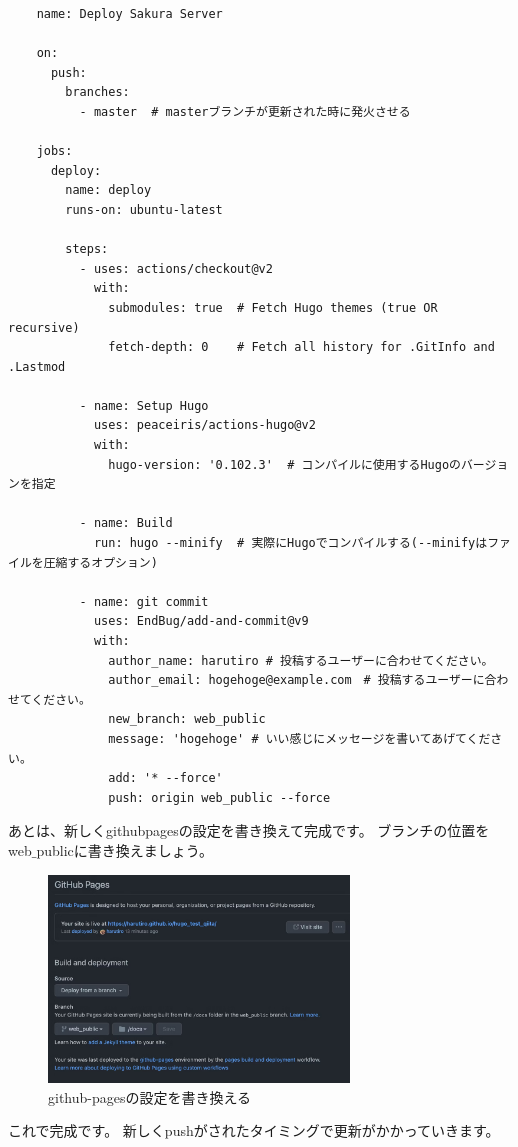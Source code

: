 \begin{tcolorbox}[breakable]
  \begin{verbatim}
    name: Deploy Sakura Server

    on:
      push:
        branches:
          - master  # masterブランチが更新された時に発火させる
    
    jobs:
      deploy:
        name: deploy
        runs-on: ubuntu-latest
        
        steps:
          - uses: actions/checkout@v2
            with:
              submodules: true  # Fetch Hugo themes (true OR recursive)
              fetch-depth: 0    # Fetch all history for .GitInfo and .Lastmod
    
          - name: Setup Hugo
            uses: peaceiris/actions-hugo@v2
            with:
              hugo-version: '0.102.3'  # コンパイルに使用するHugoのバージョンを指定
    
          - name: Build
            run: hugo --minify  # 実際にHugoでコンパイルする(--minifyはファイルを圧縮するオプション)
    
          - name: git commit
            uses: EndBug/add-and-commit@v9
            with:
              author_name: harutiro # 投稿するユーザーに合わせてください。
              author_email: hogehoge@example.com　# 投稿するユーザーに合わせてください。
              new_branch: web_public
              message: 'hogehoge' # いい感じにメッセージを書いてあげてください。
              add: '* --force' 
              push: origin web_public --force
  \end{verbatim}
\end{tcolorbox}

あとは、新しくgithubpagesの設定を書き換えて完成です。
ブランチの位置をweb$\_$publicに書き換えましょう。

\begin{figure}[H]
  \centering
  \includegraphics[width=8cm]{./image/02-chap8/web_public.png}
  \caption{github-pagesの設定を書き換える}
  \label{chap8-web_public-image}
\end{figure}

これで完成です。
新しくpushがされたタイミングで更新がかかっていきます。